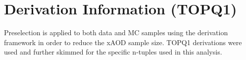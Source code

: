\chapter{Derivation Information (TOPQ1)}

Preselection is applied to both data and MC samples using the derivation framework in order to reduce the xAOD sample size.  TOPQ1 derivations were used and further skimmed for the specific n-tuples used in this analysis.